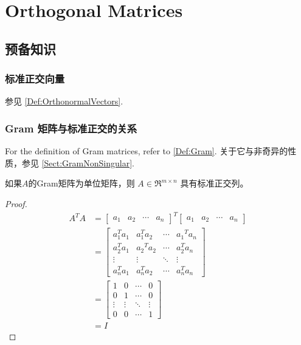 \chapter{Orthogonal Matrices}

\section{预备知识}

\subsection{标准正交向量}

参见 \ref{Def:OrthonormalVectors}.

\subsection{Gram 矩阵与标准正交的关系}

For the definition of Gram matrices, refer to \ref{Def:Gram}. 关于它与非奇异的性质，参见 \ref{Sect:GramNonSingular}.

\begin{theorem}
    如果$A$的Gram矩阵为单位矩阵，则 $ A \in \mathfrak{R}^{m \times n} $ 具有标准正交列。
\end{theorem}

\begin{proof}
    \begin{equation} \begin{aligned} A^{T} A&=\left[\begin{array}{llll}a_{1} & a_{2} & \cdots & a_{n}\end{array}\right]^{T}\left[\begin{array}{llll}a_{1} & a_{2} & \cdots & a_{n}\end{array}\right] 
    \\ &=\left[\begin{array}{cccc}a_{1}^{T} a_{1} & a_{1}^{T} a_{2} & \cdots & a_{1}{ }^{T} a_{n} \\ a_{2}^{T} a_{1} & a_{2}{ }^{T} a_{2} & \cdots & a_{2}^{T} a_{n} \\ \vdots & \vdots & \ddots & \vdots \\ a_{n}^{T} a_{1} & a_{n}^{T} a_{2} & \cdots & a_{n}^{T} a_{n}\end{array}\right] 
    \\  &=\left[\begin{array}{cccc}1 & 0 & \cdots & 0 \\ 0 & 1 & \cdots & 0 \\ \vdots & \vdots & \ddots & \vdots \\ 0 & 0 & \cdots & 1\end{array}\right] 
    \\ & =I  \end{aligned} \end{equation}
\end{proof}

